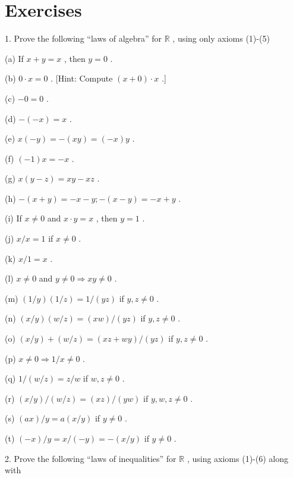 \section*{Exercises}


1. Prove the following ``laws of algebra'' for \(\mathbb{R}\) , using only axioms (1)-(5)

(a) If \(x + y = x\) , then \(y = 0\) .

(b) \(0 \cdot  x = 0\) . [Hint: Compute \(\left( {x + 0}\right)  \cdot  x\) .]

(c) \(- 0 = 0\) .

(d) \(- \left( {-x}\right)  = x\) .

(e) \(x\left( {-y}\right)  =  - \left( {xy}\right)  = \left( {-x}\right) y\) .

(f) \(\left( {-1}\right) x =  - x\) .

(g) \(x\left( {y - z}\right)  = {xy} - {xz}\) .

(h) \(- \left( {x + y}\right)  =  - x - y; - \left( {x - y}\right)  =  - x + y\) .

(i) If \(x \neq  0\) and \(x \cdot  y = x\) , then \(y = 1\) .

(j) \(x/x = 1\) if \(x \neq  0\) .

(k) \(x/1 = x\) .

(l) \(x \neq  0\) and \(y \neq  0 \Rightarrow  {xy} \neq  0\) .

(m) \(\left( {1/y}\right) \left( {1/z}\right)  = 1/\left( {yz}\right)\) if \(y,z \neq  0\) .

(n) \(\left( {x/y}\right) \left( {w/z}\right)  = \left( {xw}\right) /\left( {yz}\right)\) if \(y,z \neq  0\) .

(o) \(\left( {x/y}\right)  + \left( {w/z}\right)  = \left( {{xz} + {wy}}\right) /\left( {yz}\right)\) if \(y,z \neq  0\) .

(p) \(x \neq  0 \Rightarrow  1/x \neq  0\) .

(q) \(1/\left( {w/z}\right)  = z/w\) if \(w,z \neq  0\) .

(r) \(\left( {x/y}\right) /\left( {w/z}\right)  = \left( {xz}\right) /\left( {yw}\right)\) if \(y,w,z \neq  0\) .

(s) \(\left( {ax}\right) /y = a\left( {x/y}\right)\) if \(y \neq  0\) .

(t) \(\left( {-x}\right) /y = x/\left( {-y}\right)  =  - \left( {x/y}\right)\) if \(y \neq  0\) .

2. Prove the following ``laws of inequalities'' for \(\mathbb{R}\) , using axioms (1)-(6) along with

